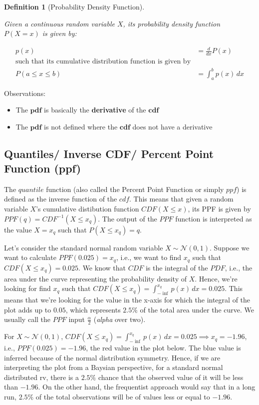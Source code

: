 \documentclass{article}
\newtheorem{definition}{Definition}[section]
\begin{document}
\begin{definition}[Probability Density Function]
	\label{def:pdf}
	
	Given a continuous random variable $X$, its probability density function $P(X = x)$ is given by:
	
	\begin{align}
		p(x) &= \frac{d}{dx} P(x) \\
		\text{such that its cumulative distribution function is given by}& \\
		P(a \leq x \leq b) &= \int_{a}^{b} p(x) \, dx
	\end{align}

\end{definition}


Observations:
\begin{itemize}
	\item The $\mathbf{pdf}$ is basically the \textbf{derivative} of the $\mathbf{cdf}$
	\item The $\mathbf{pdf}$ is not defined where the $\mathbf{cdf}$ does not have a derivative 
\end{itemize}

\subsection{Quantiles/ Inverse CDF/  Percent Point Function (ppf)}

The $quantile$ function (also called the Percent Point Function or simply $ppf$) is defined as the inverse function of the $cdf$. This means that given a random variable $X$'s cumulative distibution function $CDF(X \leq x)$, its PPF is given by $PPF(q) = CDF^{-1}(X \leq x_q)$. The output of the $PPF$ function is interpreted as the value $X = x_q$ such that $P(X \leq x_q) = q$.

Let's consider the standard normal random variable $X \sim \mathcal{N}(0, 1)$. Suppose we want to calculate $PPF(0.025) = x_q$, i.e., we want to find $x_q$ such that $CDF(X \leq x_q) = 0.025$. We know that $CDF$ is the integral of the $PDF$, i.e., the area under the curve representing the probability density of $X$. Hence, we're looking for find $x_q$ such that $CDF(X \leq x_q) = \int_{-\inf}^{x_q} p(x) \, dx = 0.025$. This means that we're looking for the value in the x-axis for which the integral of the plot adds up to $0.05$, which represents $2.5\%$ of the total area under the curve. We usually call the $PPF$ input $\frac{\alpha}{2}$ (\textit{alpha} over two).

For $X \sim \mathcal{N}(0, 1)$, $CDF(X \leq x_q) = \int_{-\inf}^{x_q} p(x) \, dx = 0.025 \implies x_q = -1.96 $, i.e., $PPF(0.025) = -1.96$, the red value in the plot below. The blue value is inferred because of the normal distribution symmetry. Hence, if we are interpreting the plot from a Baysian perspective, for a standard normal distributed rv, there is a $2.5\%$ chance that the observed value of it will be less than $-1.96$. On the other hand, the frequentist approach would say that in a long run, $2.5\%$ of the total observations will be of values less or equal to $-1.96$.
\end{document}
